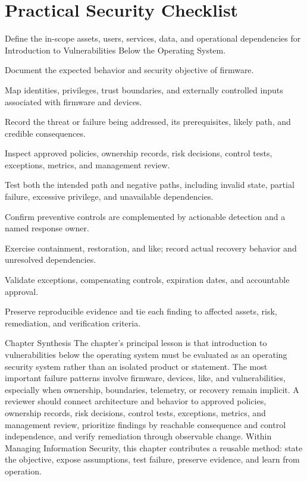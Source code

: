 \documentclass[11pt,letterpaper]{article}
\begin{document}
\section*{Practical Security Checklist}
\begin{CornellChecklist}
\item Define the in-scope assets, users, services, data, and operational dependencies for Introduction to Vulnerabilities Below the Operating System.
\item Document the expected behavior and security objective of firmware.
\item Map identities, privileges, trust boundaries, and externally controlled inputs associated with firmware and devices.
\item Record the threat or failure being addressed, its prerequisites, likely path, and credible consequences.
\item Inspect approved policies, ownership records, risk decisions, control tests, exceptions, metrics, and management review.
\item Test both the intended path and negative paths, including invalid state, partial failure, excessive privilege, and unavailable dependencies.
\item Confirm preventive controls are complemented by actionable detection and a named response owner.
\item Exercise containment, restoration, and like; record actual recovery behavior and unresolved dependencies.
\item Validate exceptions, compensating controls, expiration dates, and accountable approval.
\item Preserve reproducible evidence and tie each finding to affected assets, risk, remediation, and verification criteria.
\end{CornellChecklist}
\begin{CornellSummaryBox}{Chapter Synthesis}
The chapter's principal lesson is that introduction to vulnerabilities below the operating system must be evaluated as an operating security system rather than an isolated product or statement. The most important failure patterns involve firmware, devices, like, and vulnerabilities, especially when ownership, boundaries, telemetry, or recovery remain implicit. A reviewer should connect architecture and behavior to approved policies, ownership records, risk decisions, control tests, exceptions, metrics, and management review, prioritize findings by reachable consequence and control independence, and verify remediation through observable change. Within Managing Information Security, this chapter contributes a reusable method: state the objective, expose assumptions, test failure, preserve evidence, and learn from operation.
\end{CornellSummaryBox}
\end{document}
